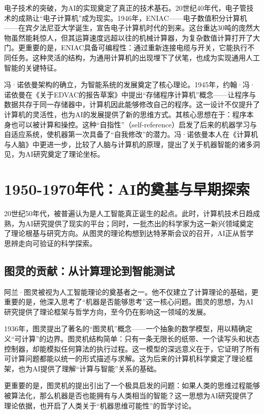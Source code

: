 电子技术的突破，为AI的实现奠定了真正的技术基石。20世纪40年代，电子管技术的成熟让“电子计算机”成为现实。1946年，ENIAC——电子数值积分计算机——在宾夕法尼亚大学诞生，宣告电子计算机时代的到来。这台重达30吨的庞然大物虽然能耗惊人，但其运算速度远超以往的机械计算器，为复杂数值计算打开了大门。更重要的是，ENIAC具备可编程性：通过重新连接电缆与开关，它能执行不同任务。这种灵活的结构，为通用计算机的出现埋下了伏笔，也成为实现通用人工智能的关键特征。

冯·诺依曼架构的确立，为智能系统的发展奠定了核心理论。1945年，约翰·冯·诺依曼在《关于EDVAC的报告草案》中提出“存储程序计算机”概念——让程序与数据共存于同一存储器中，计算机因此能够修改自己的程序。这一设计不仅提升了计算机的灵活性，也为AI的发展提供了新的思维方式。其核心思想在于：程序本身也可以被计算和操控。这种“自指性”（self-reference）启发了后来的机器学习与自适应系统，使机器第一次具备了“自我修改”的潜力。冯·诺依曼本人在《计算机与人脑》中更进一步，比较了人脑与计算机的原理，提出了关于机器智能的诸多洞见，为AI研究奠定了理论坐标。

\section{1950-1970年代：AI的奠基与早期探索}

20世纪50年代，被普遍认为是人工智能真正诞生的起点。此时，计算机技术日趋成熟，为AI研究提供了现实的平台；同时，一批杰出的科学家为这一新兴领域奠定了理论根基与研究方向。从图灵的理论构想到达特茅斯会议的召开，AI正从哲学思辨走向可验证的科学探索。

\subsection{图灵的贡献：从计算理论到智能测试}

阿兰·图灵被视为人工智能理论的奠基者之一。他不仅建立了计算理论的基础，更重要的是，他深入思考了“机器是否能够思考”这一核心问题。图灵的思想，为AI研究提供了理论框架与哲学方向，至今仍在影响这一领域的发展。

1936年，图灵提出了著名的“图灵机”概念——一个抽象的数学模型，用以精确定义“可计算”的边界。图灵机结构简单：只有一条无限长的纸带、一个读写头和状态控制器，却能模拟任何算法的执行过程。这一模型的深远意义在于，它证明了所有可计算问题都能以统一的形式描述与求解。这为后来的计算机科学奠定了理论框架，也为AI提供了理解“计算与智能”关系的基础。

更重要的是，图灵机的提出引出了一个极具启发的问题：如果人类的思维过程能够被算法化，那么机器是否也能拥有与人类相当的智能？这一思想为AI研究提供了理论依据，也开启了人类关于“机器思维可能性”的哲学讨论。

